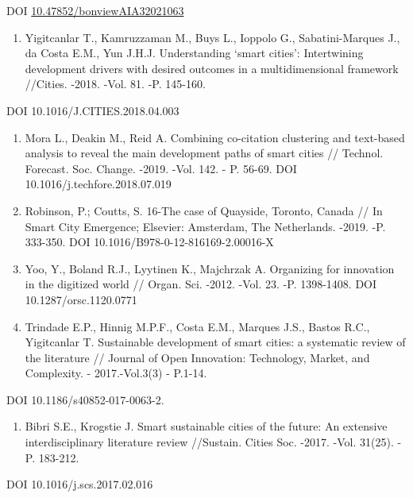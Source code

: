 DOI
\href{http://dx.doi.org/10.47852/bonviewAIA32021063}{10.47852/bonviewAIA32021063}

\begin{enumerate}
\def\labelenumi{\arabic{enumi}.}
\setcounter{enumi}{16}
\item
  Yigitcanlar T., Kamruzzaman M., Buys L., Ioppolo G., Sabatini-Marques
  J., da Costa E.M., Yun J.H.J. Understanding `smart cities':
  Intertwining development drivers with desired outcomes in a
  multidimensional framework //Cities. -2018. -Vol. 81. -P. 145-160.
\end{enumerate}

DOI 10.1016/J.CITIES.2018.04.003

\begin{enumerate}
\def\labelenumi{\arabic{enumi}.}
\setcounter{enumi}{17}
\item
  Mora L., Deakin M., Reid A. Combining co-citation clustering and
  text-based analysis to reveal the main development paths of smart
  cities // Technol. Forecast. Soc. Change. -2019. -Vol. 142. - P.
  56-69. DOI 10.1016/j.techfore.2018.07.019
\item
  Robinson, P.; Coutts, S. 16-The case of Quayside, Toronto, Canada //
  In Smart City Emergence; Elsevier: Amsterdam, The Netherlands. -2019.
  -P. 333-350. DOI 10.1016/B978-0-12-816169-2.00016-X
\item
  Yoo, Y., Boland R.J., Lyytinen K., Majchrzak A. Organizing for
  innovation in the digitized world // Organ. Sci. -2012. -Vol. 23. -P.
  1398-1408. DOI 10.1287/orsc.1120.0771
\item
  Trindade E.P., Hinnig M.P.F., Costa E.M., Marques J.S., Bastos R.C.,
  Yigitcanlar T. Sustainable development of smart cities: a systematic
  review of the literature // Journal of Open Innovation: Technology,
  Market, and Complexity. - 2017.-Vol.3(3) - P.1-14.
\end{enumerate}

DOI 10.1186/s40852-017-0063-2.

\begin{enumerate}
\def\labelenumi{\arabic{enumi}.}
\setcounter{enumi}{21}
\item
  Bibri S.E., Krogstie J. Smart sustainable cities of the future: An
  extensive interdisciplinary literature review //Sustain. Cities Soc.
  -2017. -Vol. 31(25). -P. 183-212.
\end{enumerate}

DOI 10.1016/j.scs.2017.02.016

